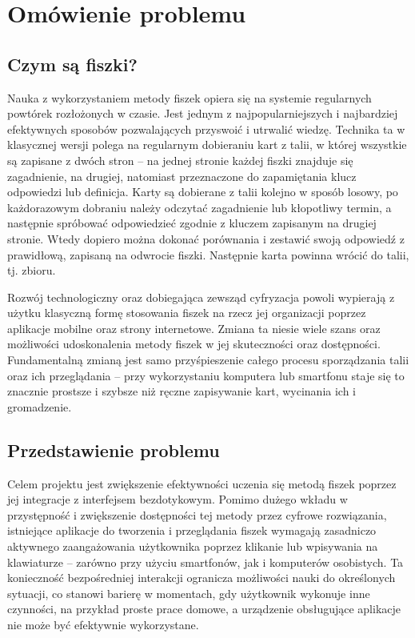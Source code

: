 \chapter{Omówienie problemu}

\section{Czym są fiszki?}

Nauka z wykorzystaniem metody fiszek opiera się na systemie regularnych powtórek rozłożonych w czasie. Jest jednym z najpopularniejszych i najbardziej efektywnych sposobów pozwalających przyswoić i utrwalić wiedzę. Technika ta w klasycznej wersji polega na regularnym dobieraniu kart z talii, w której wszystkie są zapisane z dwóch stron – na jednej stronie każdej fiszki znajduje się zagadnienie, na drugiej, natomiast przeznaczone do zapamiętania klucz odpowiedzi lub definicja. Karty są dobierane z talii kolejno w sposób losowy, po każdorazowym dobraniu należy odczytać zagadnienie lub kłopotliwy termin, a następnie spróbować odpowiedzieć zgodnie z kluczem zapisanym na drugiej stronie. Wtedy dopiero można dokonać porównania i zestawić swoją odpowiedź z prawidłową, zapisaną na odwrocie fiszki. Następnie karta powinna wrócić do talii, tj. zbioru.

Rozwój technologiczny oraz dobiegająca zewsząd cyfryzacja powoli wypierają z użytku klasyczną formę stosowania fiszek na rzecz jej organizacji poprzez aplikacje mobilne oraz strony internetowe. Zmiana ta niesie wiele szans oraz możliwości udoskonalenia metody fiszek w jej skuteczności oraz dostępności. Fundamentalną zmianą jest samo przyśpieszenie całego procesu sporządzania talii oraz ich przeglądania – przy wykorzystaniu komputera lub smartfonu staje się to znacznie prostsze i szybsze niż ręczne zapisywanie kart, wycinania ich i gromadzenie.

\section{Przedstawienie problemu}

Celem projektu jest zwiększenie efektywności uczenia się metodą fiszek poprzez jej integracje z interfejsem bezdotykowym. Pomimo dużego wkładu w przystępność i zwiększenie dostępności tej metody przez cyfrowe rozwiązania, istniejące aplikacje do tworzenia i przeglądania fiszek wymagają zasadniczo aktywnego zaangażowania użytkownika poprzez klikanie lub wpisywania na klawiaturze – zarówno przy użyciu smartfonów, jak i komputerów osobistych. Ta konieczność bezpośredniej interakcji ogranicza możliwości nauki do określonych sytuacji, co stanowi barierę w momentach, gdy użytkownik wykonuje inne czynności, na przykład proste prace domowe, a urządzenie obsługujące aplikacje nie może być efektywnie wykorzystane.

